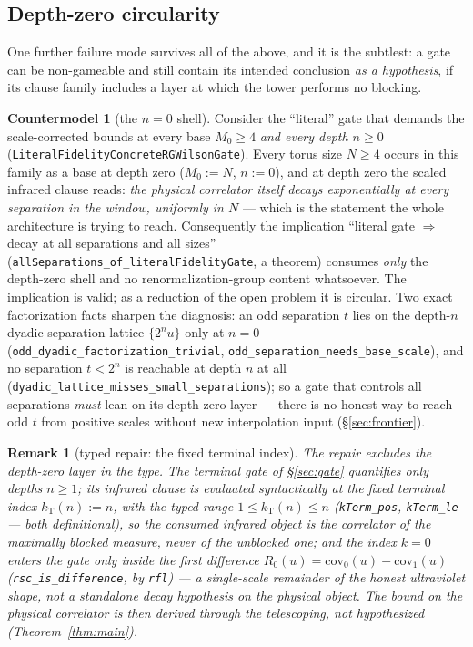 \documentclass[11pt]{article}
\newtheorem{remark}[theorem]{Remark}
\theoremstyle{definition}
\newtheorem{countermodel}[theorem]{Countermodel}
\newcommand{\lean}[1]{\texttt{#1}}
\newcommand{\kT}{k_{\mathrm{T}}}
\begin{document}
\subsection{Depth-zero circularity}\label{sec:cm4}

One further failure mode survives all of the above, and it is the
subtlest: a gate can be non-gameable and still contain its intended
conclusion \emph{as a hypothesis}, if its clause family includes a
layer at which the tower performs no blocking.

\begin{countermodel}[the $n = 0$ shell]\label{cm:circular}
Consider the ``literal'' gate that demands the scale-corrected bounds
at every base $M_0 \ge 4$ \emph{and every depth $n \ge 0$}
(\lean{LiteralFidelityConcreteRGWilsonGate}).  Every torus size
$N \ge 4$ occurs in this family as a base at depth zero
($M_0 := N$, $n := 0$), and at depth zero the scaled infrared clause
reads: \emph{the physical correlator itself decays exponentially at
every separation in the window, uniformly in $N$} --- which is the
statement the whole architecture is trying to reach.  Consequently
the implication ``literal gate $\Rightarrow$ decay at all separations
and all sizes'' (\lean{allSeparations\_of\_literalFidelityGate}, a
theorem) consumes \emph{only} the depth-zero shell and no
renormalization-group content whatsoever.  The implication is valid;
as a reduction of the open problem it is circular.  Two exact
factorization facts sharpen the diagnosis: an odd separation $t$ lies
on the depth-$n$ dyadic separation lattice $\{2^n u\}$ only at
$n = 0$ (\lean{odd\_dyadic\_factorization\_trivial},
\lean{odd\_separation\_needs\_base\_scale}), and no separation
$t < 2^n$ is reachable at depth $n$ at all
(\lean{dyadic\_lattice\_misses\_small\_separations}); so a gate that
controls all separations \emph{must} lean on its depth-zero layer ---
there is no honest way to reach odd $t$ from positive scales without
new interpolation input (\S\ref{sec:frontier}).
\end{countermodel}

\begin{remark}[typed repair: the fixed terminal index]
\label{rem:repair4}
The repair excludes the depth-zero layer in the type.  The terminal
gate of \S\ref{sec:gate} quantifies \emph{only} depths $n \ge 1$; its
infrared clause is evaluated \emph{syntactically} at the fixed
terminal index $\kT(n) := n$, with the typed range
$1 \le \kT(n) \le n$ (\lean{kTerm\_pos}, \lean{kTerm\_le} --- both
definitional), so the consumed infrared object is the correlator of
the \emph{maximally blocked} measure, never of the unblocked one; and
the index $k = 0$ enters the gate only \emph{inside the first
difference} $R_0(u) = \mathrm{cov}_0(u) - \mathrm{cov}_1(u)$
(\lean{rsc\_is\_difference}, by \lean{rfl}) --- a single-scale
remainder of the honest ultraviolet shape, not a standalone decay
hypothesis on the physical object.  The bound on the physical
correlator is then \emph{derived} through the telescoping, not
hypothesized (Theorem~\ref{thm:main}).
\end{remark}
\end{document}
